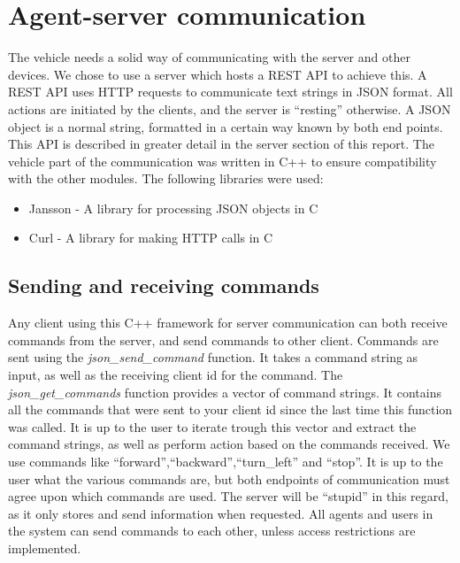 \section{Agent-server communication}
The vehicle needs a solid way of communicating with the server and other devices. 
We chose to use a server which hosts a REST API to achieve this. 
A REST API uses HTTP requests to communicate text strings in JSON format.
All actions are initiated by the clients, and the server is ``resting'' otherwise. 
A JSON object is a normal string, formatted in a certain way known by both end points.
This API is described in greater detail in the server section of this report.
The vehicle part of the communication was written in C++ to ensure compatibility with the other modules.
The following libraries were used:
\begin{itemize}
    \item Jansson - A library for processing JSON objects in C
    \item Curl - A library for making HTTP calls in C
\end{itemize}

\subsection{Sending and receiving commands}
Any client using this C++ framework for server communication can both receive commands from the server, and send commands to other client.
Commands are sent using the \textit{json\_send\_command} function.
It takes a command string as input, as well as the receiving client id for the command.
The \textit{json\_get\_commands} function provides a vector of command strings. It contains all the commands that were sent to your client id since the last time this function was called. 
It is up to the user to iterate trough this vector and extract the command strings, as well as perform action based on the commands received. 
We use commands like ``forward'',``backward'',``turn\_left'' and ``stop''.
It is up to the user what the various commands are, but both endpoints of communication must agree upon which commands are used.
The server will be ``stupid'' in this regard, as it only stores and send information when requested. 
All agents and users in the system can send commands to each other, unless access restrictions are implemented.

